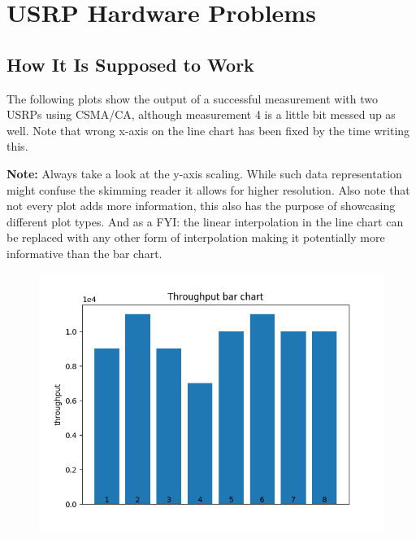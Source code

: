 \documentclass{article}
\begin{document}
\section{USRP Hardware Problems} 

\subsection{How It Is Supposed to Work}

The following plots show the output of a successful measurement with two USRPs using CSMA/CA, although measurement 4 is a little bit messed up as well. Note that wrong x-axis on the line chart has been fixed by the time writing this.

\bigskip

\textbf{Note:} Always take a look at the y-axis scaling. While such data representation might confuse the skimming reader it allows for higher resolution. Also note that not every plot adds more information, this also has the purpose of showcasing different plot types. And as a FYI: the linear interpolation in the line chart can be replaced with any other form of interpolation making it potentially more informative than the bar chart.

\begin{figure}[h] \label{usrp-success-1}
	\includegraphics[width=\textwidth]{usrp_success_tp_bar}	
\end{figure}
\end{document}
